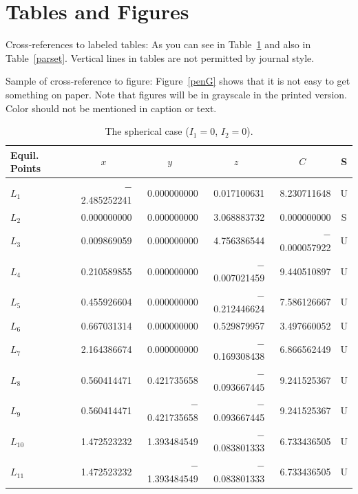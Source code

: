 \documentclass[ecta,nameyear,draft]{econsocart}
\theoremstyle{plain}
\theoremstyle{definition}
\begin{document}
\section{Tables and Figures}
Cross-references to labeled tables: As you can see in Table~\ref{sphericcase}
and also in Table~\ref{parset}. Vertical lines in tables are not permitted by journal style. 

Sample of cross-reference to figure: Figure~\ref{penG} shows that it is not easy to get something on paper. Note that figures will be in grayscale in the printed version.  Color should not be mentioned in caption or text. 
\begin{table}
\caption{The spherical case ($I_1=0$, $I_2=0$).}
\label{sphericcase}
\begin{tabular}{@{}lrrrrc@{}@{}}
\hline
Equil. Points
& \multicolumn{1}{c}{$x$}
& \multicolumn{1}{c}{$y$}
& \multicolumn{1}{c}{$z$}
& \multicolumn{1}{c}{$C$}
& S \\
\hline
$L_1$    & $-$2.485252241 & 0.000000000    & 0.017100631    & 8.230711648    & U \\
$L_2$    & 0.000000000    & 0.000000000    & 3.068883732    & 0.000000000    & S \\
$L_3$    & 0.009869059    & 0.000000000    & 4.756386544    & $-$0.000057922 & U \\
$L_4$    & 0.210589855    & 0.000000000    & $-$0.007021459 & 9.440510897    & U \\
$L_5$    & 0.455926604    & 0.000000000    & $-$0.212446624 & 7.586126667    & U \\
$L_6$    & 0.667031314    & 0.000000000    & 0.529879957    & 3.497660052    & U \\
$L_7$    & 2.164386674    & 0.000000000    & $-$0.169308438 & 6.866562449    & U \\
$L_8$    & 0.560414471    & 0.421735658    & $-$0.093667445 & 9.241525367    & U \\
$L_9$    & 0.560414471    & $-$0.421735658 & $-$0.093667445 & 9.241525367    & U \\
$L_{10}$ & 1.472523232    & 1.393484549    & $-$0.083801333 & 6.733436505    & U \\
$L_{11}$ & 1.472523232    & $-$1.393484549 & $-$0.083801333 & 6.733436505    & U \\
\hline
\end{tabular}

\end{table}
\end{document}
